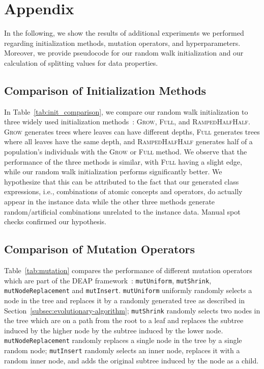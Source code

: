 \section{Appendix}
In the following, we show the results of additional experiments we performed regarding initialization methods, mutation operators, and hyperparameters. Moreover, we provide pseudocode for our random walk initialization and our calculation of splitting values for data properties.

\subsection{Comparison of Initialization Methods}

In Table~\ref{tab:init_comparison}, we compare our random walk initialization to three widely used initialization methods~\citep{Koza1992GP}: \textsc{Grow}, \textsc{Full}, and \textsc{RampedHalfHalf}. \textsc{Grow} generates trees where leaves can have different depths, \textsc{Full} generates trees where all leaves have the same depth, and \textsc{RampedHalfHalf} generates half of a population's individuals with the \textsc{Grow} or \textsc{Full} method. We observe that the performance of the three methods is similar, with \textsc{Full} having a slight edge, while our random walk initialization performs significantly better. We hypothesize that this can be attributed to the fact that our generated class expressions, i.e., combinations of atomic concepts and operators, do actually appear in the instance data while the other three methods generate random/artificial combinations unrelated to the instance data. Manual spot checks confirmed our hypothesis.

\subsection{Comparison of Mutation Operators}

Table~\ref{tab:mutation} compares the performance of different mutation operators which are part of the DEAP framework~\citep{Fortin2012DEAP}:  \texttt{mut\-Uniform}, \texttt{mut\-Shrink}, \texttt{mut\-Node\-Re\-place\-ment} and \texttt{mut\-Insert}.
\texttt{mut\-Uniform} uniformly randomly selects a node in the tree and replaces it by a randomly generated tree as described in Section~\ref{subsec:evolutionary-algorithm}; \texttt{mut\-Shrink} randomly selects two nodes in the tree which are on a path from the root to a leaf and replaces the subtree induced by the higher node by the subtree induced by the lower node. \texttt{mut\-Node\-Re\-place\-ment} randomly replaces a single node in the tree by a single random node; \texttt{mut\-Insert} randomly selects an inner node, replaces it with a random inner node, and adds the original subtree induced by the node as a child.

